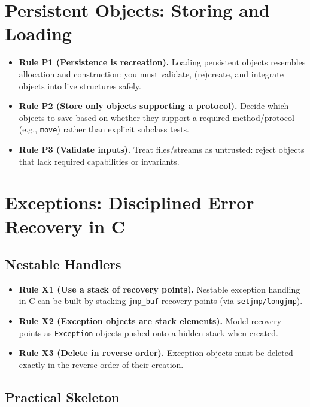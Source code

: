 \documentclass[11pt]{article}
\begin{document}
\section{Persistent Objects: Storing and Loading}

\begin{itemize}
  \item \textbf{Rule P1 (Persistence is recreation).} Loading persistent objects resembles allocation and construction: you must validate, (re)create, and integrate objects into live structures safely.
  \item \textbf{Rule P2 (Store only objects supporting a protocol).} Decide which objects to save based on whether they support a required method/protocol (e.g., \texttt{move}) rather than explicit subclass tests.
  \item \textbf{Rule P3 (Validate inputs).} Treat files/streams as untrusted: reject objects that lack required capabilities or invariants.
\end{itemize}

\section{Exceptions: Disciplined Error Recovery in C}

\subsection{Nestable Handlers}

\begin{itemize}
  \item \textbf{Rule X1 (Use a stack of recovery points).} Nestable exception handling in C can be built by stacking \texttt{jmp\_buf} recovery points (via \texttt{setjmp/longjmp}).
  \item \textbf{Rule X2 (Exception objects are stack elements).} Model recovery points as \texttt{Exception} objects pushed onto a hidden stack when created.
  \item \textbf{Rule X3 (Delete in reverse order).} Exception objects must be deleted exactly in the reverse order of their creation.
\end{itemize}

\subsection{Practical Skeleton}
\end{document}
